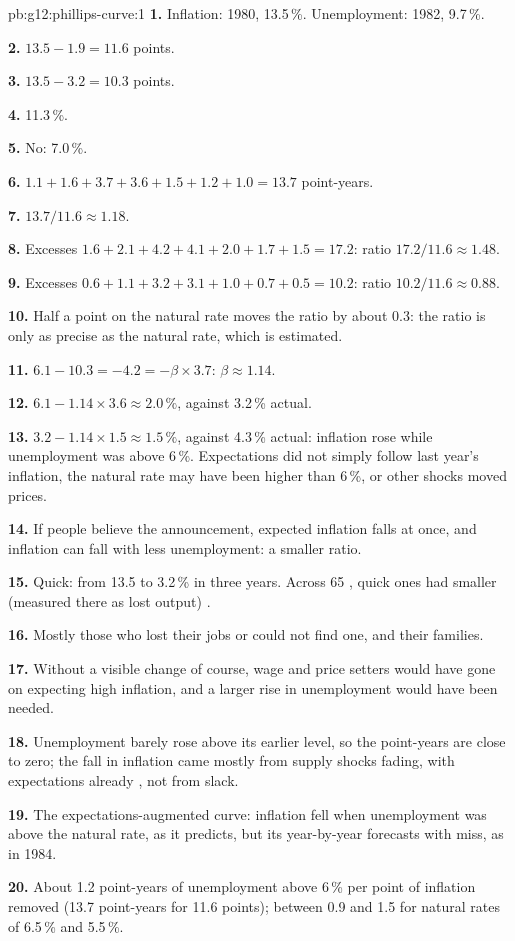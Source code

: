 \begin{solution}{pb:g12:phillips-curve:1}
\textbf{1.} Inflation: 1980, 13.5\,\%. Unemployment: 1982, 9.7\,\%.

\textbf{2.} $13.5 - 1.9 = 11.6$ points.

\textbf{3.} $13.5 - 3.2 = 10.3$ points.

\textbf{4.} 11.3\,\%.

\textbf{5.} No: 7.0\,\%.

\textbf{6.} $1.1 + 1.6 + 3.7 + 3.6 + 1.5 + 1.2 + 1.0 = 13.7$ point-years.

\textbf{7.} $13.7/11.6 \approx 1.18$.

\textbf{8.} Excesses $1.6 + 2.1 + 4.2 + 4.1 + 2.0 + 1.7 + 1.5 = 17.2$: ratio $17.2/11.6 \approx 1.48$.

\textbf{9.} Excesses $0.6 + 1.1 + 3.2 + 3.1 + 1.0 + 0.7 + 0.5 = 10.2$: ratio $10.2/11.6 \approx 0.88$.

\textbf{10.} Half a point on the natural rate moves the ratio by about 0.3: the ratio is only as precise as the natural rate, which is estimated.

\textbf{11.} $6.1 - 10.3 = -4.2 = -\beta \times 3.7$: $\beta \approx 1.14$.

\textbf{12.} $6.1 - 1.14 \times 3.6 \approx 2.0\,\%$, against 3.2\,\% actual.

\textbf{13.} $3.2 - 1.14 \times 1.5 \approx 1.5\,\%$, against 4.3\,\% actual: inflation rose while unemployment was above 6\,\%. Expectations did not simply follow last year's inflation,
the natural rate may have been higher than 6\,\%, or other shocks moved prices.

\textbf{14.} If people believe the announcement, expected inflation falls at once, and inflation can fall with less unemployment: a smaller ratio.

\textbf{15.} Quick: from 13.5 to 3.2\,\% in three years. Across 65 , quick ones had smaller (measured there as lost output) .

\textbf{16.} Mostly those who lost their jobs or could not find one, and their families.

\textbf{17.} Without a visible change of course, wage and price setters would have gone on expecting high inflation, and a larger rise in unemployment would have been needed.

\textbf{18.} Unemployment barely rose above its earlier level, so the point-years are close to zero; the fall in inflation came mostly from supply shocks fading, with expectations
already , not from slack.

\textbf{19.} The expectations-augmented curve: inflation fell when unemployment was above the natural rate, as it predicts, but its year-by-year forecasts with  miss, as in 1984.

\textbf{20.} About 1.2 point-years of unemployment above 6\,\% per point of inflation removed (13.7 point-years for 11.6 points); between 0.9 and 1.5 for natural rates of
6.5\,\% and 5.5\,\%.
\end{solution}
